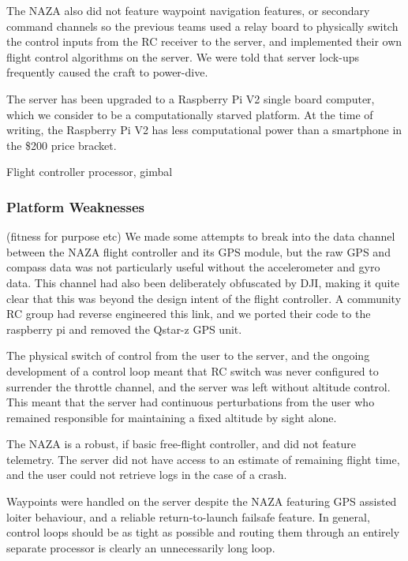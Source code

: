 \documentclass[a4paper, 11pt, titlepage]{article}
\begin{document}
      The NAZA also did not feature waypoint navigation features, or secondary command channels so the previous teams used a relay board to physically switch the control inputs from the RC receiver to the server, and implemented their own flight control algorithms on the server.  We were told that server lock-ups frequently caused the craft to power-dive.
      
      The server has been upgraded to a Raspberry Pi V2 single board computer, which we consider to be a computationally starved platform.  At the time of writing, the Raspberry Pi V2 has less computational power than a smartphone in the \$200 price bracket.

      Flight controller
       processor, gimbal
    \subsubsection{Platform Weaknesses}
      (fitness for purpose etc)
      We made some attempts to break into the data channel between the NAZA flight controller and its GPS module, but the raw GPS and compass data was not particularly useful without the accelerometer and gyro data.  This channel had also been deliberately obfuscated by DJI, making it quite clear that this was beyond the design intent of the flight controller.  A community RC group had reverse engineered this link, and we ported their code to the raspberry pi and removed the Qstar-z GPS unit.
      
      The physical switch of control from the user to the server, and the ongoing development of a control loop meant that RC switch was never configured to surrender the throttle channel, and the server was left without altitude control.  This meant that the server had continuous perturbations from the user who remained responsible for maintaining a fixed altitude by sight alone.

      The NAZA is a robust, if basic free-flight controller, and did not feature telemetry.  The server did not have access to an estimate of remaining flight time, and the user could not retrieve logs in the case of a crash.

      Waypoints were handled on the server despite the NAZA featuring GPS assisted loiter behaviour, and a reliable return-to-launch failsafe feature.  In general, control loops should be as tight as possible and routing them through an entirely separate processor is clearly an unnecessarily long loop.
\end{document}

